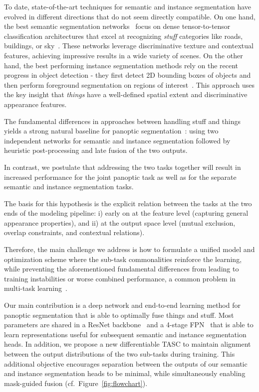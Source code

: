 \documentclass[10pt,twocolumn]{article}
\begin{document}
To date, state-of-the-art techniques for semantic and instance segmentation have evolved in different directions that do not seem directly compatible.
On one hand, the best semantic segmentation networks~\cite{bulo2017place, zhao2017pyramid, deeplabv3plus2018} focus on dense tensor-to-tensor classification architectures that excel at recognizing \textit{stuff} categories like roads, buildings, or sky~\cite{adelson2001seeing}. These networks leverage discriminative texture and contextual features, achieving impressive results in a wide variety of scenes.
On the other hand, the best performing instance segmentation methods rely on the recent progress in object detection - they first detect 2D bounding boxes of objects and then perform foreground segmentation on regions of interest~\cite{pinheiro2015learning, he2017mask, liu2018path}. This approach uses the key insight that \textit{things} have a well-defined spatial extent and discriminative appearance features.

The fundamental differences in approaches between handling stuff and things yields a strong natural baseline for panoptic segmentation~\cite{kirillov2018panoptic}: using two independent networks for semantic and instance segmentation followed by heuristic post-processing and late fusion of the two outputs. 

In contrast, we postulate that addressing the two tasks together will result in increased performance for the joint panoptic task as well as for the separate semantic and instance segmentation tasks.

The basis for this hypothesis is the explicit relation between the tasks at the two ends of the modeling pipeline: i) early on at the feature level (capturing general appearance properties), and ii) at the output space level (mutual exclusion, overlap constraints, and contextual relations).

Therefore, the main challenge we address is how to formulate a unified model and optimization scheme where the sub-task commonalities reinforce the learning, while preventing the aforementioned fundamental differences from leading to training instabilities or worse combined performance, a common problem in multi-task learning~\cite{zamir2018taskonomy}.

Our main contribution is a deep network and end-to-end learning method for panoptic segmentation that is able to optimally fuse things and stuff.
Most parameters are shared in a ResNet backbone~\cite{he2016resnet} and a 4-stage \ac{FPN}~\cite{lin2017feature} that is able to learn representations useful for subsequent semantic and instance segmentation heads.
In addition, we propose a new differentiable \ac{TASC} to maintain alignment between the output distributions of the two sub-tasks during training.
This additional objective encourages separation between the outputs of our semantic and instance segmentation heads to be minimal, while simultaneously enabling mask-guided fusion (cf.~Figure~\ref{fig:flowchart}).
\end{document}
